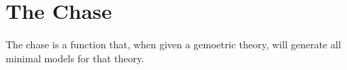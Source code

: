 \section{The Chase}

	The chase is a function that, when given a gemoetric theory, will
	generate all minimal models for that theory.
